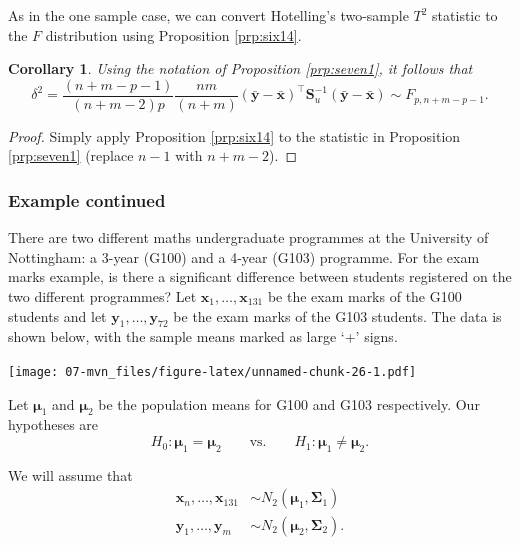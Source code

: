 \documentclass[
]{book}
\newtheorem{corollary}{Corollary}[chapter]
\theoremstyle{definition}
\theoremstyle{definition}
\theoremstyle{definition}
\theoremstyle{definition}
\theoremstyle{remark}
\begin{document}
As in the one sample case, we can convert Hotelling's two-sample \(T^2\) statistic to the \(F\) distribution using Proposition \ref{prp:six14}.

\begin{corollary}
\protect\hypertarget{cor:cseven1}{}\label{cor:cseven1}Using the notation of Proposition \ref{prp:seven1}, it follows that
\[\delta^2 = \frac{(n+m-p-1)}{(n+m-2)p} \frac{nm}{(n+m)} (\bar{\mathbf y} - \bar{\mathbf x})^\top \mathbf S_u^{-1} (\bar{\mathbf y} - \bar{\mathbf x}) \sim F_{p,n+m-p-1}.\]
\end{corollary}

\begin{proof}
Simply apply Proposition \ref{prp:six14} to the statistic in Proposition \ref{prp:seven1} (replace \(n-1\) with \(n+m-2\)).
\end{proof}

\subsubsection*{Example continued}\label{example-continued-2}

There are two different maths undergraduate programmes at the University of Nottingham: a 3-year (G100) and a 4-year (G103) programme. For the exam marks example, is there a significant difference between students registered on the two different programmes? Let \(\mathbf x_1,\ldots, \mathbf x_{131}\) be the exam marks of the G100 students and let \(\mathbf y_1,\ldots, \mathbf y_{72}\) be the exam marks of the G103 students. The data is shown below, with the sample means marked as large `+' signs.

\texttt{[image: 07-mvn\_files/figure-latex/unnamed-chunk-26-1.pdf]}

Let \({\boldsymbol{\mu}}_1\) and \({\boldsymbol{\mu}}_2\) be the population means for G100 and G103 respectively. Our hypotheses are
\[H_0: {\boldsymbol{\mu}}_1 = {\boldsymbol{\mu}}_2 \qquad \text{vs.} \qquad H_1: {\boldsymbol{\mu}}_1 \neq {\boldsymbol{\mu}}_2.\]

We will assume that
\begin{align*}
\mathbf x_n, \ldots, \mathbf x_{131}&\sim N_2({\boldsymbol{\mu}}_1,\boldsymbol{\Sigma}_1)\\
\mathbf y_1,\ldots,\mathbf y_m &\sim  N_2({\boldsymbol{\mu}}_2,\boldsymbol{\Sigma}_2).
\end{align*}
\end{document}
